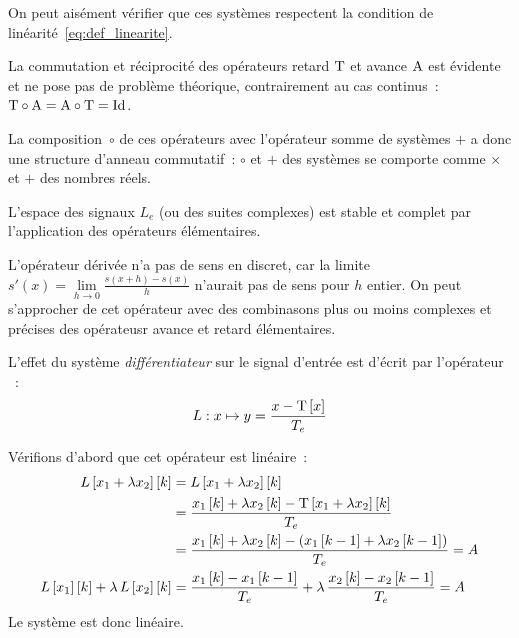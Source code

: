 On peut aisément vérifier que ces systèmes respectent la condition de
linéarité~\ref{eq:def_linearite}.

\begin{remarque}
  La commutation et réciprocité des opérateurs retard $\mathrm{T}$ et
  avance $\mathrm{A}$ est évidente et ne pose pas de problème théorique,
  contrairement au cas continus~:
  $\mathrm{T}\circ\mathrm{A}=\mathrm{A}\circ\mathrm{T}=\mathrm{Id}$.

  La composition~$\circ$ de ces opérateurs avec l'opérateur somme de
  systèmes $+$ a donc une structure d'anneau commutatif~: $\circ$ et
  $+$ des systèmes se comporte comme $\times$ et $+$ des nombres
  réels.

  L'espace des signaux $L_e$ (ou des suites complexes) est stable et
  complet par l'application des opérateurs élémentaires.
\end{remarque}

L'opérateur dérivée n'a pas de sens en discret, car la limite
$s'(x)=\lim\limits_{h\to 0} \frac{s(x+h)-s(x)}{h}$ n'aurait pas de
sens pour $h$ entier. On peut s'approcher de cet opérateur avec des
combinasons plus ou moins complexes et précises des opérateusr avance
et retard élémentaires.

\begin{exemple}
  \label{exemple:differentiateur_lineaire}
  L'effet du système \emph{différentiateur} sur le signal d'entrée est
  d'écrit par l'opérateur ~:
  $$L : x \mapsto y=\frac{x-\mathrm{T}\left[x\right]}{T_e}$$
  
  Vérifions d'abord que cet opérateur est linéaire~:
  \begin{eqnarray*}
    L\left[x_1+\lambda x_2\right]\left[k\right] &= L\left[x_1+\lambda x_2\right]\left[k\right]\\
                              &= \frac{x_1\left[k\right]+\lambda x_2\left[k\right] - \mathrm{T}\left[x_1+\lambda x_2\right]\left[k\right]}{T_e}\\
                              &= \frac{x_1\left[k\right]+\lambda x_2\left[k\right] - \left(x_1\left[k-1\right]+\lambda x_2\left[k-1\right]\right)}{T_e} = A\\
    L\left[x_{1}\right]\left[k\right]+\lambda\,L\left[x_{2}\right]\left[k\right]  &= \frac{x_1\left[k\right] - x_1\left[k-1\right]}{T_e}+\lambda\,\frac{x_2\left[k\right] - x_2\left[k-1\right]}{T_e}=A
  \end{eqnarray*}
  Le système est donc linéaire.
\end{exemple}


